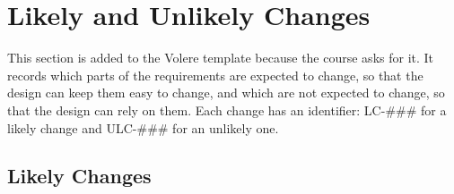 \documentclass[12pt]{article}
\renewcommand{\_}{\textunderscore\allowbreak}%
\begin{document}
\section{Likely and Unlikely Changes}
\label{sec:changes}

This section is added to the Volere template because the course asks for it. It
records which parts of the requirements are expected to change, so that the
design can keep them easy to change, and which are not expected to change, so
that the design can rely on them. Each change has an identifier: LC-\#\#\# for a
likely change and ULC-\#\#\# for an unlikely one.

\subsection{Likely Changes}
\end{document}
